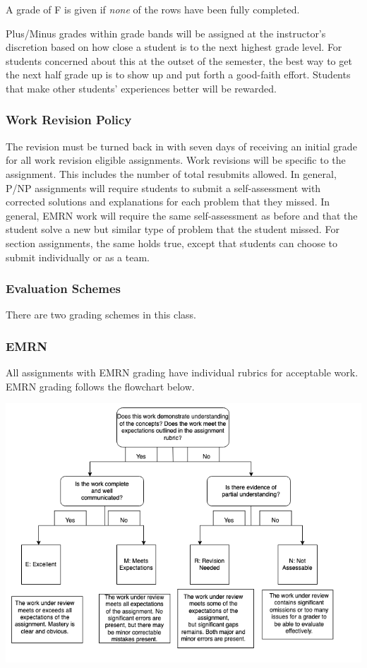 \documentclass[
  11pt,
]{article}
\begin{document}
A grade of F is given if \emph{none} of the rows have been fully
completed.

Plus/Minus grades within grade bands will be assigned at the
instructor's discretion based on how close a student is to the next
highest grade level. For students concerned about this at the outset of
the semester, the best way to get the next half grade up is to show up
and put forth a good-faith effort. Students that make other students'
experiences better will be rewarded.

\hypertarget{work-revision-policy}{%
\subsubsection{Work Revision Policy}\label{work-revision-policy}}

The revision must be turned back in with seven days of receiving an
initial grade for all work revision eligible assignments. Work revisions
will be specific to the assignment. This includes the number of total
resubmits allowed. In general, P/NP assignments will require students to
submit a self-assessment with corrected solutions and explanations for
each problem that they missed. In general, EMRN work will require the
same self-assessment as before and that the student solve a new but
similar type of problem that the student missed. For section
assignments, the same holds true, except that students can choose to
submit individually or as a team.

\hypertarget{evaluation}{%
\subsubsection{Evaluation Schemes}\label{evaluation}}

There are two grading schemes in this class.

\hypertarget{emrn}{%
\subsubsection{EMRN}\label{emrn}}

All assignments with EMRN grading have individual rubrics for acceptable
work. EMRN grading follows the flowchart below.

\includegraphics{grades/EMRN.png}
\end{document}
